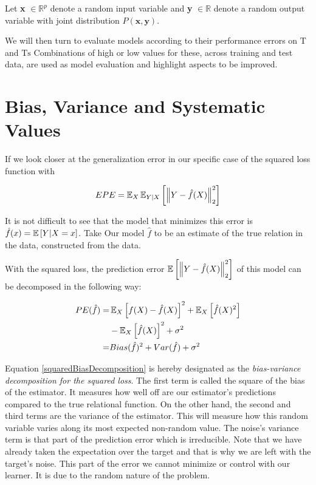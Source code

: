 Let \textbf{x} $\in \mathbb{R}^{p}$ denote a random input variable and \textbf{y} $\in \mathbb{R}$ denote a random output variable with joint distribution $P\left(\textbf{x},\textbf{y}\right)$.

We will then turn to evaluate models according to their performance errors on $\mathrm{T}$ and $\mathrm{Ts}$ Combinations of high or low values for these, across training and test data, are used as model evaluation and highlight aspects to be improved.

\section{Bias, Variance and Systematic Values} \label{subsection-biasVariance}	If we look closer at the generalization error in our specific case of the squared loss function with 

\begin{equation}\label{squaredPE}
EPE = \operatorname{\mathbb{E}}_X \operatorname{\mathbb{E}}_{Y|X} \left[ \left\Vert Y - \hat{f}(X) \right\Vert_2^2 \right]
\end{equation}

It is not difficult to see that the model that minimizes this error is $\hat{f}(x) = \operatorname{\mathbb{E}} \left[ Y | X=x \right] $. Take Our model $\hat{f}$ to be an estimate of the true relation in the data, constructed from the data.

With the squared loss, the prediction error $\operatorname{\mathbb{E}} \left[ \left\Vert Y - \hat{f}(X) \right\Vert_2^2 \right]$ of this model can be decomposed in the following way:

\begin{equation}\label{squaredBiasDecomposition}
\begin{split}
PE( \hat{f} ) = & \operatorname{\mathbb{E}}_X \left[  f(X) - \hat{f}(X) \right]^2 + \operatorname{\mathbb{E}}_X \left[ \hat{f}(X)^2 \right] \\
& - \operatorname{\mathbb{E}}_X \left[ \hat{f}(X) \right]^2 + \sigma^2 \\
= & Bias(\hat{f})^2 + Var(\hat{f}) + \sigma^2
\end{split}
\end{equation}


Equation \cref{squaredBiasDecomposition} is hereby designated as the \textit{bias-variance decomposition for the squared loss}. The first term is called the square of the bias of the estimator. It measures how well off are our estimator's predictions compared to the true relational function. On the other hand, the second and third terms are the variance of the estimator. This will measure how this random variable varies along its most expected non-random value. The noise's variance term is that part of the prediction error which is irreducible. Note that we have already taken the expectation over the target and that is why we are left with the target's noise. This part of the error we cannot minimize or control with our learner. It is due to the random nature of the problem.

